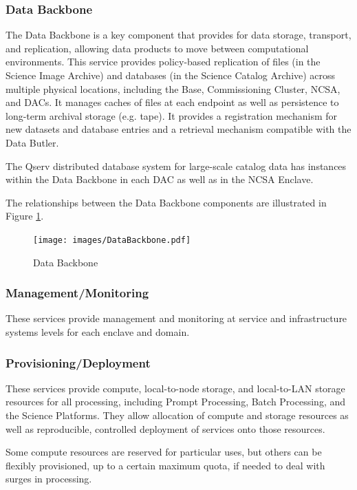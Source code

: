 \documentclass[DM,lsstdraft,toc]{lsstdoc}
\begin{document}
\subsubsection{Data Backbone}\label{data-backbone}

The Data Backbone is a key component that provides for data storage,
transport, and replication, allowing data products to move between
computational environments. This service provides policy-based
replication of files (in the Science Image Archive) and databases (in
the Science Catalog Archive) across multiple physical locations,
including the Base, Commissioning Cluster, NCSA, and DACs. It manages
caches of files at each endpoint as well as persistence to long-term
archival storage (e.g. tape). It provides a registration mechanism for
new datasets and database entries and a retrieval mechanism compatible
with the Data Butler.

The Qserv distributed database system for large-scale catalog data has
instances within the Data Backbone in each DAC as well as in the NCSA
Enclave.

The relationships between the Data Backbone components are illustrated
in Figure \ref{fig:dbb}.

\begin{figure}
\centering
\texttt{[image: images/DataBackbone.pdf]}
\caption{Data Backbone}
\label{fig:dbb}
\end{figure}

\subsubsection{Management/Monitoring}\label{managementmonitoring}

These services provide management and monitoring at service and
infrastructure systems levels for each enclave and domain.

\subsubsection{Provisioning/Deployment}\label{provisioningdeployment}

These services provide compute, local-to-node storage, and local-to-LAN
storage resources for all processing, including Prompt Processing, Batch
Processing, and the Science Platforms. They allow allocation of compute
and storage resources as well as reproducible, controlled deployment of
services onto those resources.

Some compute resources are reserved for particular uses, but others can
be flexibly provisioned, up to a certain maximum quota, if needed to
deal with surges in processing.
\end{document}
